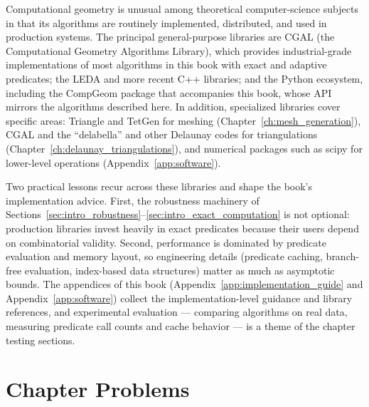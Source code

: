 Computational geometry is unusual among theoretical computer-science
subjects in that its algorithms are routinely implemented, distributed, and
used in production systems. The principal general-purpose libraries are
CGAL (the Computational Geometry Algorithms Library), which provides
industrial-grade implementations of most algorithms in this book with exact
and adaptive predicates; the LEDA and more recent C++ libraries; and the
Python ecosystem, including the CompGeom package that accompanies this book,
whose API mirrors the algorithms described here. In addition, specialized
libraries cover specific areas: Triangle and TetGen for meshing
(Chapter~\ref{ch:mesh_generation}), CGAL and the ``delabella'' and other
Delaunay codes for triangulations (Chapter~\ref{ch:delaunay_triangulations}),
and numerical packages such as scipy for lower-level operations
(Appendix~\ref{app:software}).

Two practical lessons recur across these libraries and shape the book's
implementation advice. First, the robustness machinery of
Sections~\ref{sec:intro_robustness}--\ref{sec:intro_exact_computation} is
not optional: production libraries invest heavily in exact predicates
because their users depend on combinatorial validity. Second, performance
is dominated by predicate evaluation and memory layout, so engineering
details (predicate caching, branch-free evaluation, index-based data
structures) matter as much as asymptotic bounds. The appendices of this book
(Appendix~\ref{app:implementation_guide} and Appendix~\ref{app:software})
collect the implementation-level guidance and library references, and
experimental evaluation --- comparing algorithms on real data, measuring
predicate call counts and cache behavior --- is a theme of the chapter
testing sections.


\section{Chapter Problems}
\label{sec:intro_problems}

